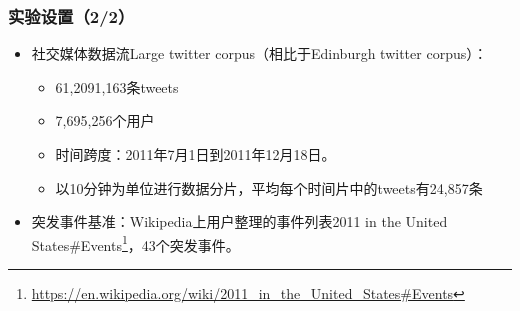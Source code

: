 \begin{frame}
\frametitle{\noindent 实验设置（2/2）}

\begin{itemize}
	\item 社交媒体数据流Large twitter corpus（相比于Edinburgh twitter corpus）：
	\begin{itemize}
		\item 61,2091,163条tweets
		\item 7,695,256个用户
		\item 时间跨度：2011年7月1日到2011年12月18日。
		\item 以10分钟为单位进行数据分片，平均每个时间片中的tweets有24,857条
	\end{itemize}
	\item 突发事件基准：Wikipedia上用户整理的事件列表2011 in the United States\#Events\footnote{\url{https://en.wikipedia.org/wiki/2011_in_the_United_States\#Events}}，43个突发事件。
\end{itemize} 
\end{frame}

